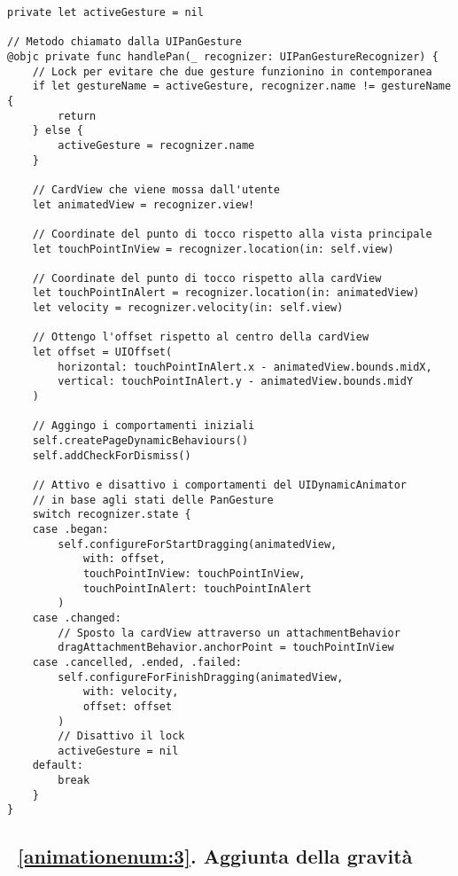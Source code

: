\begin{verbatim}
private let activeGesture = nil

// Metodo chiamato dalla UIPanGesture
@objc private func handlePan(_ recognizer: UIPanGestureRecognizer) {
    // Lock per evitare che due gesture funzionino in contemporanea
    if let gestureName = activeGesture, recognizer.name != gestureName {
        return
    } else {
        activeGesture = recognizer.name
    }
    
    // CardView che viene mossa dall'utente
    let animatedView = recognizer.view!
    
    // Coordinate del punto di tocco rispetto alla vista principale
    let touchPointInView = recognizer.location(in: self.view)

    // Coordinate del punto di tocco rispetto alla cardView
    let touchPointInAlert = recognizer.location(in: animatedView)
    let velocity = recognizer.velocity(in: self.view)
    
    // Ottengo l'offset rispetto al centro della cardView
    let offset = UIOffset(
        horizontal: touchPointInAlert.x - animatedView.bounds.midX,
        vertical: touchPointInAlert.y - animatedView.bounds.midY
    )

    // Aggingo i comportamenti iniziali
    self.createPageDynamicBehaviours()
    self.addCheckForDismiss()
    
    // Attivo e disattivo i comportamenti del UIDynamicAnimator
    // in base agli stati delle PanGesture
    switch recognizer.state {
    case .began:
        self.configureForStartDragging(animatedView,
            with: offset,
            touchPointInView: touchPointInView,
            touchPointInAlert: touchPointInAlert
        )
    case .changed:
        // Sposto la cardView attraverso un attachmentBehavior
        dragAttachmentBehavior.anchorPoint = touchPointInView
    case .cancelled, .ended, .failed:
        self.configureForFinishDragging(animatedView,
            with: velocity,
            offset: offset
        )
        // Disattivo il lock
        activeGesture = nil
    default:
        break
    }
}
\end{verbatim}

\subsection{~\ref{animationenum:3}. Aggiunta della gravità }

